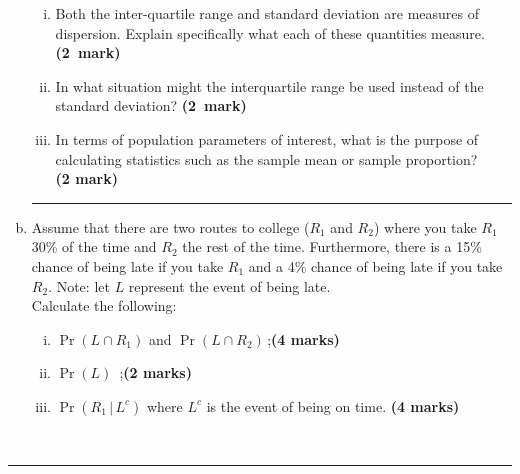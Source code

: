 \documentclass[12pt]{article}
\begin{document}
\begin{enumerate}[a)]
    \begin{enumerate}[i)]\itemsep0.3cm
    \item Both the inter-quartile range and standard deviation are measures of dispersion. Explain specifically what each of these quantities \mbox{measure.} \hfill{\mbox{\scriptsize \bf (2 mark)}}
    \item In what situation might the interquartile range be used instead of the standard deviation? \hfill{\mbox{\scriptsize \bf (2 mark)}}
   \item In terms of population parameters of interest, what is the purpose of calculating statistics such as the sample mean or sample proportion?\\\phantom{a}\hfill{\scriptsize \bf (2 mark)}
    \end{enumerate}
\begin{center}\noindent\rule{0.4\linewidth}{0.5pt}\end{center}
\item Assume that there are two routes to college ($R_1$ and $R_2$) where you take $R_1$ 30\% of the time and $R_2$ the rest of the time. Furthermore, there is a 15\% chance of being late if you take $R_1$ and a 4\% chance of being late if you take $R_2$. Note: let $L$ represent the event of being late.\\[0.2cm]
    Calculate the following:
    \begin{enumerate}[i)]\itemsep0.4cm
    \item $\Pr(L\cap R_1)$ and $\Pr(L\cap R_2)$\,;\hfill{\scriptsize \bf (4 marks)}
    \item $\Pr(L)$ \,;\hfill{\scriptsize \bf (2 marks)}
    \item $\Pr(R_1\,|\,L^c)$ where $L^c$ is the event of being on time. \hfill{\scriptsize \bf (4 marks)}
    \end{enumerate}
\end{enumerate}
\quad\\[-0.3cm]
\noindent\rule{\linewidth}{1pt}

\newpage
\end{document}

